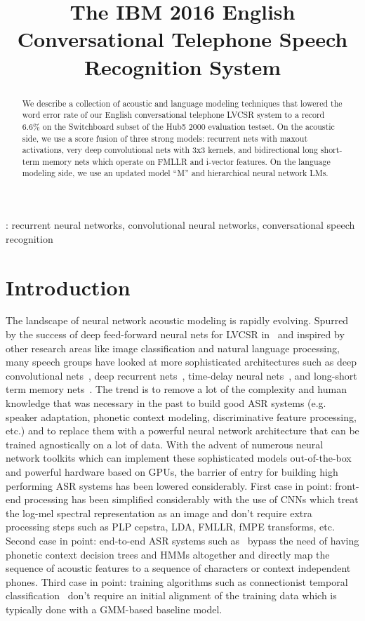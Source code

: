 \documentclass[a4paper]{article}
\title{The IBM 2016 English Conversational Telephone Speech Recognition System}
\begin{document}
\maketitle

\begin{abstract} 

  We describe a collection of acoustic and language modeling
  techniques that lowered the word error rate of our English
  conversational telephone LVCSR system to a record 6.6\% on the
  Switchboard subset of the Hub5 2000 evaluation testset. On the
  acoustic side, we use a score fusion of three strong models:
  recurrent nets with maxout activations, very deep convolutional nets
  with 3x3 kernels, and bidirectional long short-term memory nets which
  operate on FMLLR and i-vector features. On the language modeling side, we
  use an updated model ``M'' and hierarchical neural network LMs.

\end{abstract}

: recurrent neural networks, convolutional neural networks, conversational speech recognition

\section{Introduction}

The landscape of neural network acoustic modeling is rapidly evolving.
Spurred by the success of deep feed-forward neural nets for LVCSR
in~\cite{seide11} and inspired by other research areas like image
classification and natural language processing, many speech groups
have looked at more sophisticated architectures such as deep
convolutional nets~\cite{abdelhamid13, sainath13}, deep recurrent
nets~\cite{saon14}, time-delay neural nets~\cite{peddinti15}, and
long-short term memory nets~\cite{hannun14, sak15, miao15, mohamed15}. The trend is
to remove a lot of the complexity and human knowledge that was
necessary in the past to build good ASR systems (e.g. speaker
adaptation, phonetic context modeling, discriminative feature
processing, etc.) and to replace them with a powerful neural network
architecture that can be trained agnostically on a lot of
data. With the advent of numerous neural network toolkits which can
implement these sophisticated models out-of-the-box and powerful
hardware based on GPUs, the barrier of entry for building high
performing ASR systems has been lowered considerably. First case in
point: front-end processing has been simplified considerably with the
use of CNNs which treat the log-mel spectral representation as an
image and don't require extra processing steps such as PLP cepstra,
LDA, FMLLR, fMPE transforms, etc. Second case in point: end-to-end ASR
systems such as~\cite{hannun14,miao15,sak15} bypass the need of having
phonetic context decision trees and HMMs altogether and directly map
the sequence of acoustic features to a sequence of characters or
context independent phones. Third case in point: training algorithms
such as connectionist temporal classification~\cite{graves13} don't require an initial
alignment of the training data which is typically done with a
GMM-based baseline model.
\end{document}
